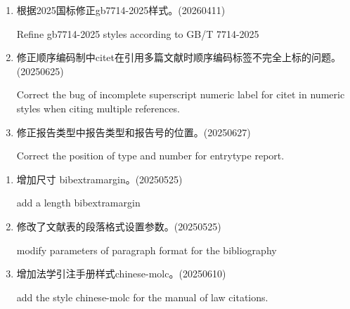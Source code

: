 


\label{up:20260411}

\begin{enumerate}

\item 根据2025国标修正gb7714-2025样式。(20260411)

Refine gb7714-2025 styles according to GB/T 7714-2025

\item 修正顺序编码制中citet在引用多篇文献时顺序编码标签不完全上标的问题。(20250625)

Correct the bug of incomplete superscript numeric label for citet in numeric styles when citing multiple references.

\item 修正报告类型中报告类型和报告号的位置。(20250627)

Correct the position of type and number for entrytype report.

\end{enumerate}





\label{up:20250610}
\begin{enumerate}

\item 增加尺寸 bibextramargin。(20250525)

add a length bibextramargin

\item 修改了文献表的段落格式设置参数。(20250525)

modify parameters of paragraph format for the bibliography

\item 增加法学引注手册样式chinese-molc。(20250610)

add the style chinese-molc for the manual of law citations.

\end{enumerate}

